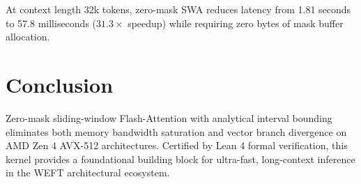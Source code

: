 \documentclass[10pt,twocolumn,letterpaper]{article}
\begin{document}
At context length 32k tokens, zero-mask SWA reduces latency from 1.81 seconds to 57.8 milliseconds ($31.3\times$ speedup) while requiring zero bytes of mask buffer allocation.

\section{Conclusion}

Zero-mask sliding-window Flash-Attention with analytical interval bounding eliminates both memory bandwidth saturation and vector branch divergence on AMD Zen 4 AVX-512 architectures. Certified by Lean 4 formal verification, this kernel provides a foundational building block for ultra-fast, long-context inference in the WEFT architectural ecosystem.
\end{document}
